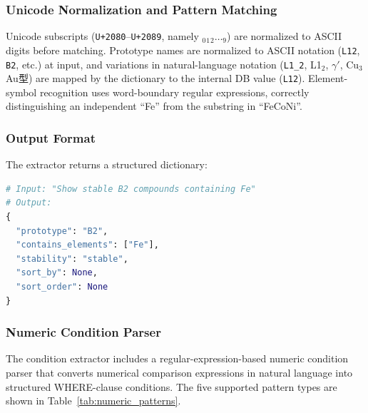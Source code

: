 \documentclass[5p,twocolumn]{elsarticle}
\begin{document}
\subsubsection{Unicode Normalization and Pattern Matching}

Unicode subscripts (\texttt{U+2080}--\texttt{U+2089}, namely $_0 {}_1 {}_2 \ldots {}_9$) are normalized to ASCII digits before matching.
Prototype names are normalized to ASCII notation (\texttt{L12}, \texttt{B2}, etc.) at input,
and variations in natural-language notation (\texttt{L1\_2}, L1$_2$, $\gamma'$, Cu$_3$Au型) are
mapped by the dictionary to the internal DB value (\texttt{L12}).
Element-symbol recognition uses word-boundary regular expressions,
correctly distinguishing an independent ``Fe'' from the substring in ``FeCoNi''.

\subsubsection{Output Format}

The extractor returns a structured dictionary:

\begin{lstlisting}[language=Python,caption={Example of condition extraction.},label=lst:extract]
# Input: "Show stable B2 compounds containing Fe"
# Output:
{
  "prototype": "B2",
  "contains_elements": ["Fe"],
  "stability": "stable",
  "sort_by": None,
  "sort_order": None
}
\end{lstlisting}

\subsubsection{Numeric Condition Parser}
\label{sec:numeric_parser}

The condition extractor includes a regular-expression-based numeric condition parser
that converts numerical comparison expressions in natural language into structured WHERE-clause conditions.
The five supported pattern types are shown in Table~\ref{tab:numeric_patterns}.
\end{document}
